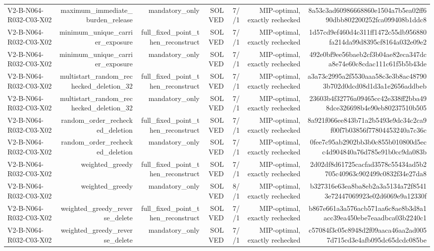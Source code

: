 {\begin{longtable}{lrrrrrr}
V2-B-N064-R032-C03-X02 & maximum\_immediate\_burden\_release & mandatory\_only & SOLVED & 7//1 & MIP-optimal, exactly rechecked & 8a53c3ad60986668860e1504a7b5ea02ff690dbb802200252fca099408b1ddc8 \\
V2-B-N064-R032-C03-X02 & minimum\_unique\_carrier\_exposure & full\_fixed\_point\_then\_reconstruct & SOLVED & 7//1 & MIP-optimal, exactly rechecked & 1d57cd9ef460d4c311ff1472c55db956880fa214da99d8395cf8164a032e09e2 \\
V2-B-N064-R032-C03-X02 & minimum\_unique\_carrier\_exposure & mandatory\_only & SOLVED & 7//1 & MIP-optimal, exactly rechecked & 492e0bf9ee56baeb2cf3b04ae82eca347dca8e74e60c8cdac111c61f5b5b43de \\
V2-B-N064-R032-C03-X02 & multistart\_random\_rechecked\_deletion\_32 & full\_fixed\_point\_then\_reconstruct & SOLVED & 7//1 & MIP-optimal, exactly rechecked & a3a73c2995a2f5530aaa58c3e3b8ac487903b702d0dcd08d1d3a1e2656addbeb \\
V2-B-N064-R032-C03-X02 & multistart\_random\_rechecked\_deletion\_32 & mandatory\_only & SOLVED & 7//1 & MIP-optimal, exactly rechecked & 23603b4f32776a09465cc42e338ff2bba498dce326698b4e90eb80237510b505 \\
V2-B-N064-R032-C03-X02 & random\_order\_rechecked\_deletion & full\_fixed\_point\_then\_reconstruct & SOLVED & 7//1 & MIP-optimal, exactly rechecked & 8a921f066ee843b71a2b5493e9dc34c2ca9f00f7b03856f77804453240a7c36c \\
V2-B-N064-R032-C03-X02 & random\_order\_rechecked\_deletion & mandatory\_only & SOLVED & 7//1 & MIP-optimal, exactly rechecked & 0fee7c95ab2902bb3b0c855b010800d5ecc4d904840a76d785e91b0cc9da083b \\
V2-B-N064-R032-C03-X02 & weighted\_greedy & full\_fixed\_point\_then\_reconstruct & SOLVED & 7//1 & MIP-optimal, exactly rechecked & 2d02df8d61725cacfad3578c55434ad5b2705c40963c902499c0832f34e27da8 \\
V2-B-N064-R032-C03-X02 & weighted\_greedy & mandatory\_only & SOLVED & 8//1 & MIP-optimal, exactly rechecked & b327316e63ea8ba8eb2a3a5134a72f85413e72447069923e02d6069e9a12330f \\
V2-B-N064-R032-C03-X02 & weighted\_greedy\_reverse\_delete & full\_fixed\_point\_then\_reconstruct & SOLVED & 7//1 & MIP-optimal, exactly rechecked & b867e661a3a576acb571aa6c8ae8b3d8a1acc39ea450ebe7eaadbca03b2240c1 \\
V2-B-N064-R032-C03-X02 & weighted\_greedy\_reverse\_delete & mandatory\_only & SOLVED & 7//1 & MIP-optimal, exactly rechecked & c57084f3c05c8948d2f09aaca46aa2ad0057d715cd3e4afb095dc65dcdc085be \\

\end{longtable}}
